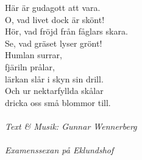 \vspace{10pt}
Här är gudagott att vara.\\
O, vad livet dock är skönt!\\
Hör, vad fröjd från fåglars skara.\\
Se, vad gräset lyser grönt!\\
Humlan surrar,\\
fjäriln prålar,\\
lärkan slår i skyn sin drill.\\
Och ur nektarfyllda skålar\\
dricka oss små blommor till.\\
\\
  {\footnotesize\textit{Text \& Musik: Gunnar Wennerberg\\
      \\
      Examenssexan på Eklundshof}}

